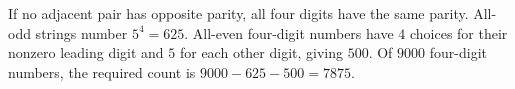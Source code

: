 If no adjacent pair has opposite parity, all four digits have the same parity. All-odd strings number $5^4=625$. All-even four-digit numbers have $4$ choices for their nonzero leading digit and $5$ for each other digit, giving $500$. Of $9000$ four-digit numbers, the required count is $9000-625-500=\boxed{7875}$.
